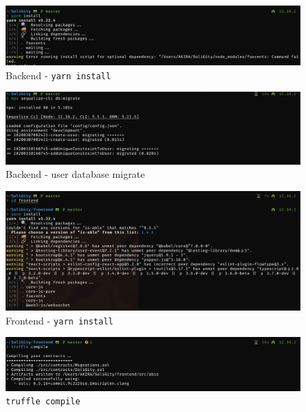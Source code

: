 \documentclass[12pt]{article}
\renewcommand{\_}{\kern-1.5pt\textunderscore\kern-1.5pt}
\begin{document}
\begin{figure}[H]
	\centering
	\includegraphics[width=13cm]{graphs/02. yarn_install_backend}
	\caption{Backend - \texttt{yarn install}}
\end{figure}

\begin{figure}[H]
	\centering
	\includegraphics[width=13cm]{graphs/03. user_db_migrate}
	\caption{Backend - user database migrate}
\end{figure}

\begin{figure}[H]
	\centering
	\includegraphics[width=13cm]{graphs/04. yarn_install_frontend}
	\caption{Frontend - \texttt{yarn install}}
\end{figure}

\begin{figure}[H]
	\centering
	\includegraphics[width=13cm]{graphs/05. truffle_compile}
	\caption{\texttt{truffle compile}}
\end{figure}
\end{document}
